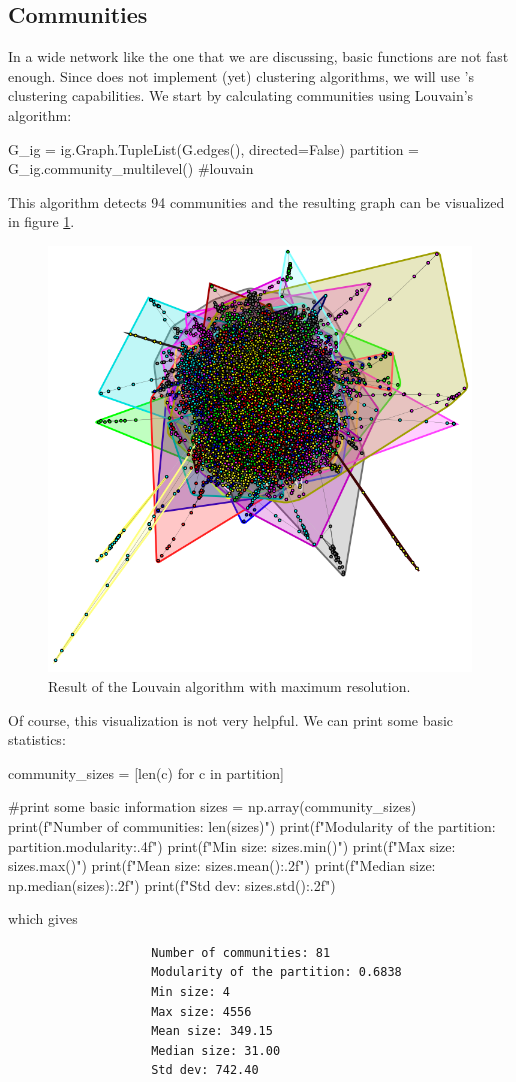 \documentclass[12pt]{article}
\begin{document}
\subsection{Communities}
In a wide network like the one that we are discussing, basic  functions are not fast enough. Since  does not implement (yet) clustering algorithms, we will use 's clustering capabilities. We start by calculating communities using Louvain's algorithm:
\begin{py}
	G_ig = ig.Graph.TupleList(G.edges(), directed=False)
	partition = G_ig.community_multilevel()  #louvain
\end{py}
This algorithm detects 94 communities and the resulting graph can be visualized in figure \ref{fig:screenshot008}. 
\begin{figure}[h]
	\centering
	\includegraphics[width=0.6\linewidth]{screenshot008}
	\caption{Result of the Louvain algorithm with maximum resolution.}
	\label{fig:screenshot008}
\end{figure}
Of course, this visualization is not very helpful. We can print some basic statistics:
\begin{py}
	community_sizes = [len(c) for c in partition]
	
	#print some basic information
	sizes = np.array(community_sizes)
	print(f"Number of communities: {len(sizes)}")
	print(f"Modularity of the partition: {partition.modularity:.4f}")
	print(f"Min size: {sizes.min()}")
	print(f"Max size: {sizes.max()}")
	print(f"Mean size: {sizes.mean():.2f}")
	print(f"Median size: {np.median(sizes):.2f}")
	print(f"Std dev: {sizes.std():.2f}")
\end{py}
which gives
\begin{center}
	\begin{verbatim}
					Number of communities: 81
					Modularity of the partition: 0.6838
					Min size: 4
					Max size: 4556
					Mean size: 349.15
					Median size: 31.00
					Std dev: 742.40
	\end{verbatim}
\end{center}
\end{document}
